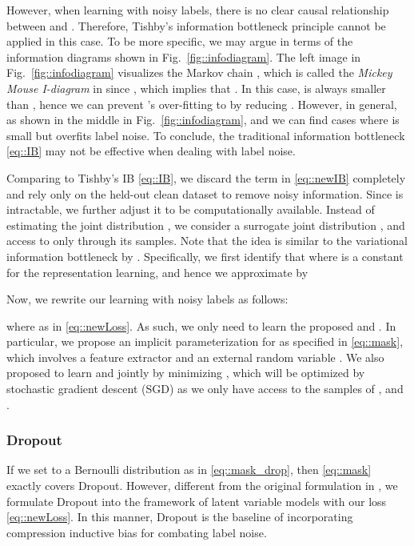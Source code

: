 \documentclass[journal]{IEEEtran}
\begin{document}
However, when learning with noisy labels, there is no clear causal relationship between  and .
Therefore, Tishby's information bottleneck principle cannot be applied in this case.
To be more specific, we may argue in terms of the information diagrams shown in Fig.~\ref{fig::infodiagram}.
The left image in Fig.~\ref{fig::infodiagram} visualizes the Markov chain , which is called the \textit{Mickey Mouse I-diagram} in \cite{kirsch2020unpacking} since , which implies that .
In this case,  is always smaller than , hence we can prevent 's over-fitting to  by reducing .
However, in general,  as shown in the middle in Fig.~\ref{fig::infodiagram}, and we can find cases where  is small but  overfits label noise.
To conclude, the traditional information bottleneck \eqref{eq::IB} may not be effective when dealing with label noise.



Comparing to Tishby's IB \eqref{eq::IB}, we discard the term  in \eqref{eq::newIB} completely and rely only on the held-out clean dataset to remove noisy information.
Since  is intractable, we further adjust it to be computationally available.
Instead of estimating the joint distribution , we consider a surrogate joint distribution , and access to  only through its samples.
Note that the idea is similar to the variational information bottleneck by \cite{alemi2016deep}.
Specifically, we first identify that  where  is a constant for the representation learning, and hence we approximate  by


Now, we rewrite our learning with noisy labels as follows:

where  as in \eqref{eq::newLoss}.
As such, we only need to learn the proposed  and .
In particular, we propose an implicit parameterization for  as specified in \eqref{eq::mask}, which involves a feature extractor  and an external random variable .
We also proposed to learn  and  jointly by minimizing , which will be optimized by stochastic gradient descent (SGD) as we only have access to the samples of ,  and .

\subsubsection{Dropout}
If we set  to a Bernoulli distribution as in \eqref{eq::mask_drop}, then \eqref{eq::mask} exactly covers Dropout.
However, different from the original formulation in \cite{srivastava2014dropout}, we formulate Dropout into the framework of latent variable models with our loss \eqref{eq::newLoss}.
In this manner, Dropout is the baseline of incorporating compression inductive bias for combating label noise.
\end{document}
